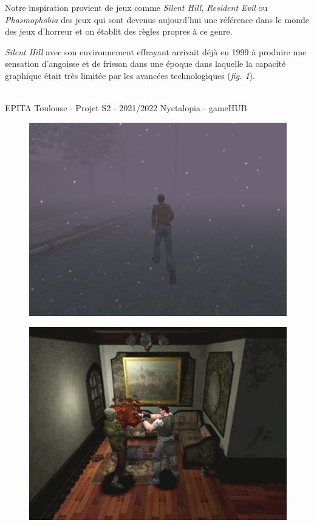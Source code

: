 Notre inspiration provient de jeux comme \emph{Silent Hill}, \emph{Resident Evil} ou \emph{Phasmophobia} des jeux qui sont devenus aujourd'hui une référence dans le monde des jeux d'horreur et on établit des règles propres à ce genre.

\emph{Silent Hill} avec son environnement effrayant arrivait déjà en 1999 à produire une sensation d'angoisse et de frisson dans une époque dans laquelle la capacité graphique était très limitée par les avancées technologiques (\emph{fig. 1}).

\vfill
\noindent\makebox[\linewidth]{\rule{.8\paperwidth}{.6pt}}\\[0.2cm]
EPITA Toulouse - Projet S2 - 2021/2022 \hfill Nyctalopia - gameHUB
\noindent\makebox[\linewidth]{\rule{.8\paperwidth}{.6pt}}

\begin{figure}[H]
\centering
\begin{minipage}{.5\textwidth}
  \centering
  \includegraphics[width=.6\linewidth]{img/silenthill.jpg}
  \label{fig:silenthill}
\end{minipage}%
\begin{minipage}{.5\textwidth}
  \centering
  \includegraphics[width=.6\linewidth]{img/residentevil.jpg}
  \label{fig:residentevil}
\end{minipage}
\end{figure}

